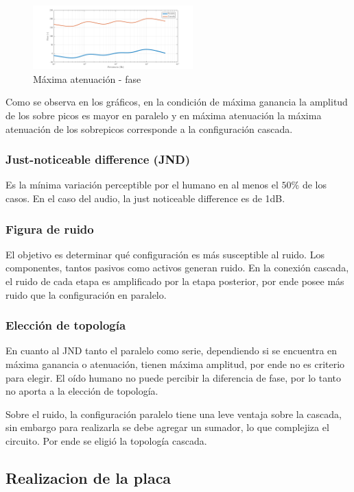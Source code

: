 \documentclass[../../tc_tp3_main.tex]{subfiles}
\begin{document}
\begin{figure}[H]
\centering
\includegraphics[width=0.55\textwidth]{imagenes/parCasSimMin_f.png}
\caption{M\'axima atenuación - fase} 
\end{figure}

Como se observa en los gráficos, en la condición de máxima ganancia la amplitud de los sobre picos es mayor en paralelo y en máxima atenuación la máxima atenuación de los sobrepicos corresponde a la configuración cascada.


\subsubsection{Just-noticeable difference (JND)}
Es la m\'inima variaci\'on perceptible por el humano en al menos el $50\%$ de los casos. En el caso del audio, la just noticeable difference es de 1dB.
\subsubsection{Figura de ruido}
El objetivo es determinar qu\'e configuración es más susceptible al ruido. Los componentes, tantos pasivos como activos generan ruido. En la conexión cascada, el ruido de cada etapa es amplificado por la etapa posterior, por ende posee más ruido que la configuración en paralelo.

\subsubsection{Elección de topología}

En cuanto al JND tanto el paralelo como  serie, dependiendo si se encuentra en máxima ganancia o atenuación, tienen máxima amplitud, por ende no es criterio para elegir. El oído humano no puede percibir la diferencia de fase, por lo tanto no aporta a la elección de topología.\par 
Sobre el ruido, la configuración paralelo tiene una leve ventaja sobre la cascada, sin embargo para realizarla se debe agregar un sumador, lo que complejiza el circuito. Por ende se eligió la topología cascada.

\subsection{Realizacion de la placa}
\end{document}
